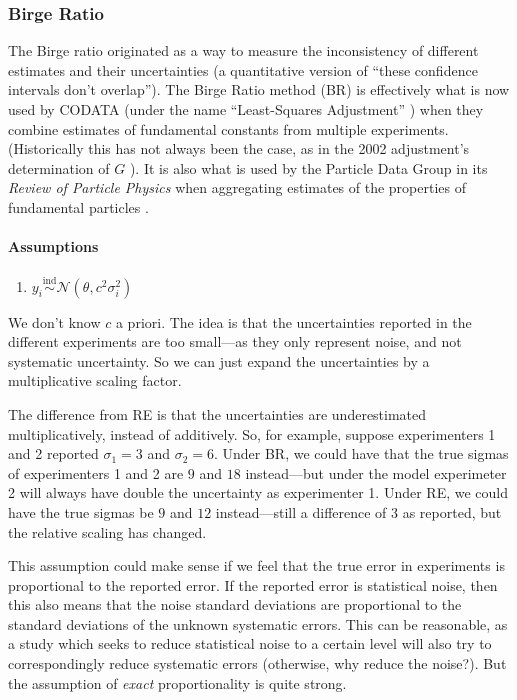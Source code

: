 \documentclass[12pt]{article}
\begin{document}
\subsubsection{Birge Ratio}

The Birge ratio originated as a way to measure the inconsistency of different estimates and their uncertainties (a quantitative version of ``these confidence intervals don't overlap''). The Birge Ratio method (BR) is effectively what is now used by CODATA (under the name ``Least-Squares Adjustment'' \citep{tiesinga2021codata}) when they combine estimates of fundamental constants from multiple experiments. (Historically this has not always been the case, as in the 2002 adjustment's determination of $G$ \citep{mohr2005codata}). It is also what is used by the Particle Data Group in its \emph{Review of Particle Physics} when aggregating estimates of the properties of fundamental particles \citep[Section 5.2.2]{navas2024review}.

\paragraph{Assumptions}\label{assumptions-2}

\begin{enumerate}
\item
  $y_i\overset{\mathrm{ind}}{\sim}\mathcal{N}(\theta,c^2\sigma_i^2)$
\end{enumerate}

We don't know $c$ a priori. The idea is that the uncertainties reported in the different experiments are too small---as they only represent noise, and not systematic uncertainty. So we can just expand the uncertainties by a multiplicative scaling factor.

The difference from RE is that the uncertainties are underestimated multiplicatively, instead of additively. So, for example, suppose experimenters 1 and 2 reported $\sigma_1=3$ and $\sigma_2=6$. Under BR, we could have that the true sigmas of experimenters 1 and 2 are $9$ and $18$ instead---but under the model experimeter 2 will always have double the uncertainty as experimenter 1. Under RE, we could have the true sigmas be $9$ and $12$ instead---still a difference of 3 as reported, but the relative scaling has changed.

This assumption could make sense if we feel that the true error in experiments is proportional to the reported error. If the reported error is statistical noise, then this also means that the noise standard deviations are proportional to the standard deviations of the unknown systematic errors. This can be reasonable, as a study which seeks to reduce statistical noise to a certain level will also try to correspondingly reduce systematic errors (otherwise, why reduce the noise?). But the assumption of \emph{exact} proportionality is quite strong.
\end{document}
